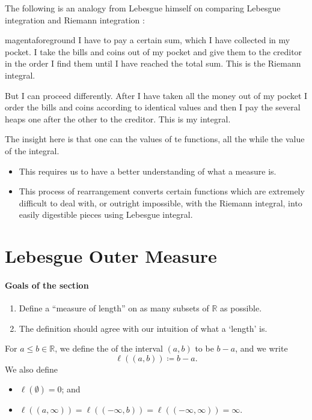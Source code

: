 \documentclass[notoc,notitlepage]{tufte-book}
\begin{document}
The following is an analogy from Lebesgue himself on comparing Lebesgue
integration and Riemann integration \cite{siegmund2008}:

\begin{quotebox}{magenta}{foreground}
  I have to pay a certain sum, which I have collected in my pocket. I take the
  bills and coins out of my pocket and give them to the creditor in the order I
  find them until I have reached the total sum. This is the Riemann integral.

  But I can proceed differently. After I have taken all the money out of my
  pocket I order the bills and coins according to identical values and then I
  pay the several heaps one after the other to the creditor. This is my
  integral.
\end{quotebox}

The insight here is that one can  the values of te
functions, all the while  the value of the integral.
\begin{itemize}
  \item This requires us to have a better understanding of what a measure is.
  \item This process of rearrangement converts certain functions which are
    extremely difficult to deal with, or outright impossible, with the Riemann
    integral, into easily digestible pieces using Lebesgue integral.
\end{itemize}


\section{Lebesgue Outer Measure}%
\label{sec:lebesgue_outer_measure}

\paragraph{Goals of the section}

\begin{enumerate}
  \item Define a ``measure of length'' on as many subsets of $\mathbb{R}$ as
    possible.
  \item The definition should agree with our intuition of what a `length' is.
\end{enumerate}

\begin{defn}[Length]\label{defn:length}
  For $a \leq b \in \mathbb{R}$, we define the  of the interval
  $(a, b)$ to be $b - a$, and we write
  \begin{equation*}
    \ell((a, b)) \coloneqq b - a.
  \end{equation*}
  We also define
  \begin{itemize}
    \item $\ell(\emptyset) = 0$; and
    \item $\ell((a, \infty)) = \ell((-\infty, b)) = \ell((-\infty, \infty)) =
      \infty$.
  \end{itemize}
\end{defn}
\end{document}
